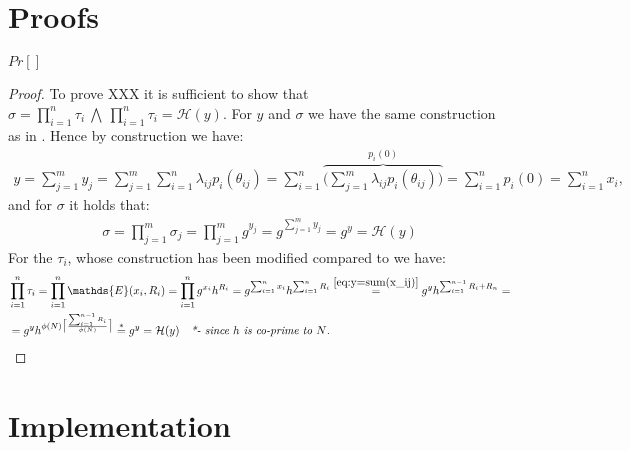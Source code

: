 \section{Proofs}
\begin{thm}[Correctness]
$Pr[]$
\end{thm}
\begin{proof}
To prove XXX it is sufficient to show that $\sigma= \prod_{i=1}^n \tau_i \:\bigwedge\: \prod_{i=1}^n \tau_i = \mathcal{H}(y)$. For $y$ and $\sigma$ we have the same construction as in \cite{VAHSS}. Hence by construction we have:
\begin{align}
    \label{eq:y=sum(x_ij)}
    y = \sum_{j=1}^m y_j= \sum_{j=1}^m \sum_{i=1}^n \lambda_{ij}p_i(\theta_{ij}) = \sum_{i=1}^n \overbrace{ \Big (\sum_{j=1}^m \lambda_{ij}p_i(\theta_{ij}) \Big)}^{ p_i(0)} = \sum_{i=1}^n p_i(0) = \sum_{i=1}^n x_i,
\end{align}
and for $\sigma$ it holds that:
\begin{align*}
    \sigma = \prod_{j=1}^m \sigma_j = \prod_{j=1}^m g^{y_j} = g^{\sum_{j=1}^my_j} =g^y = \mathcal{H}(y)
\end{align*}
For the $\tau_i$, whose construction has been modified compared to \cite{VAHSS} we have:
\begin{align*}
    &\prod_{i=1}^n \tau_i = \prod_{i=1}^n \mathds{E}(x_i,R_i)= \prod_{i=1}^n g^{x_i}h^{R_i} = g^{\sum_{i=1}^n x_i } h^{\sum_{i=1}^n R_i} \overset{\eqref{eq:y=sum(x_ij)}}{=} g^y h^{\sum_{i=1}^{n-1} R_i+R_n} = \\ 
    &= g^y h^{ \phi(N)\big\lceil \frac{\sum_{i=1}^{n-1}R_i}{\phi(N) }\big\rceil}  \overset{*}{=} g^y = \mathcal{H}(y) \quad \textit{*- since $h$ is co-prime to $N$.}
\end{align*}

\end{proof}

\section{Implementation}